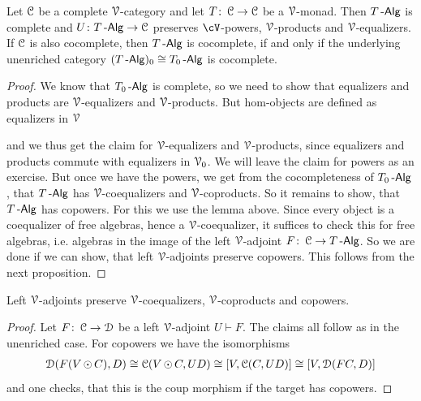 \documentclass[a4paper,11pt,oneside,openany]{scrbook}
\begin{document}
\begin{thm}
	Let $\C$ be a complete $\V$-category and let $T \from \C \to \C$ be a $\V$-monad. Then $T\Alg$ is complete and $U \from T\Alg \to \C$ preserves $\cV$-powers,
	$\V$-products and $\V$-equalizers. If $\C$ is also cocomplete, then $T\Alg$ is cocomplete, if and only if the underlying unenriched category
	$(T\Alg)_{0} \iso T_{0}\Alg$ is cocomplete.
\end{thm}

\begin{proof}
	We know that $T_{0}\Alg$ is complete, so we need to show that equalizers and products are $\V$-equalizers and $\V$-products. But hom-objects are
	defined as equalizers in $\V$
	\begin{center}
	\end{center}
	and we thus get the claim for $\V$-equalizers and $\V$-products, since equalizers and products commute with equalizers in $\V_{0}$. We will leave the
	claim for powers as an exercise. But once we have the powers, we get from the cocompleteness of $T_{0}\Alg$, that $T\Alg$ has $\V$-coequalizers and
	$\V$-coproducts. So it remains to show, that $T\Alg$ has copowers. For this we use the lemma above. Since every object is a coequalizer of free
	algebras, hence a $\V$-coequalizer, it suffices to check this for free algebras, i.e. algebras in the image of the left $\V$-adjoint
	$F \from \C \to T\Alg$. So we are done if we can show, that left $\V$-adjoints preserve copowers. This follows from the next proposition.
\end{proof}

\begin{prop}
	Left $\V$-adjoints preserve $\V$-coequalizers, $\V$-coproducts and copowers.
\end{prop}

\begin{proof}
	Let $F \from \C \to \D$ be a left $\V$-adjoint $U\vdash F$. The claims all follow as in the unenriched case. For copowers we have the isomorphisms
	\begin{align*}
		\D(F(V\copw C),D) \iso \C(V\copw C,UD) \iso \lbrack V,\C(C,UD) \rbrack \iso \lbrack V,\D(FC,D) \rbrack
	\end{align*}
	and one checks, that this is the coup morphism if the target has copowers.
\end{proof}
\end{document}
